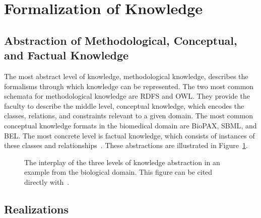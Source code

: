 \section{Formalization of Knowledge}

\subsection{Abstraction of Methodological, Conceptual, and Factual Knowledge}

The most abstract level of knowledge, methodological knowledge, describes the formalisms through which knowledge can be represented.
The two most common schemata for methodological knowledge are \ac{RDFS} and \ac{OWL}.
They provide the faculty to describe the middle level, conceptual knowledge, which encodes the classes, relations, and constraints relevant to a given domain.
The most common conceptual knowledge formats in the biomedical domain are \ac{BioPAX}, \ac{SBML}, and \ac{BEL}.
The most concrete level is factual knowledge, which consists of instances of these classes and relationships~\cite{Marchetti2008}.
These abstractions are illustrated in Figure~\ref{fig:knowledge_types}.

\begin{figure}
    \captionsetup{format=plain}
    \caption[Levels of Knowledge Abstraction]{The interplay of the three levels of knowledge abstraction in an example from the biological domain. This figure can be cited directly with~\cite{Hoyt2019KnowledgeLevels}.}
    \label{fig:knowledge_types}
\end{figure}

\subsection{Realizations}

